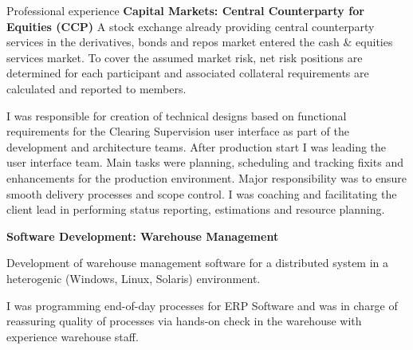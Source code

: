 \begin{rubric}{Professional experience}
\entry*[12/2001 - 06/2003] \textbf{Capital Markets: Central Counterparty for Equities (CCP)}\newline
{} 
A stock exchange already providing central counterparty services in the derivatives, bonds and repos market entered the cash \& equities services market. To cover the assumed market risk, net risk positions are determined for each participant and associated collateral requirements are calculated and reported to members. 

I was responsible for creation of technical designs based on functional requirements for the Clearing Supervision user interface as part of the development and architecture teams.
After production start I was leading the user interface team. Main tasks were planning, scheduling and tracking fixits and enhancements for the production environment. Major responsibility was to ensure smooth delivery processes and scope control. I was coaching and facilitating the client lead in performing status reporting,
estimations and resource planning.


\entry*[01/2001 - 10/2001] \textbf{Software Development: Warehouse Management}\newline

Development of warehouse management software for a distributed system in a heterogenic (Windows, Linux, Solaris) environment.

I was programming end-of-day processes for ERP Software and was in charge of reassuring quality of processes via hands-on check in the warehouse with experience warehouse staff.






\end{rubric}
